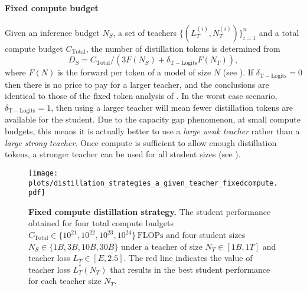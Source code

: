 \paragraph{Fixed compute budget}
Given an inference budget $N_S$, a set of teachers $\{(L_T^{(i)},N_T^{(i)})\}_{i=1}^n$ and a total compute budget $C_{\mathrm{Total}}$,
the number of distillation tokens is determined from 
\begin{equation}
    D_S=C_{\mathrm{Total}}/(3F(N_S)+\delta_{\mathrm{T-Logits}}F(N_T)),
\end{equation}
where $F(N)$ is the forward \flops per token of a model of size $N$ (see ).
If $\delta_{\mathrm{T-Logits}}=0$ then there is no price to pay for a larger teacher, and the conclusions are identical to those of the fixed token analysis of .
In the worst case scenario, $\delta_{\mathrm{T-Logits}}=1$, then using a larger teacher
will mean fewer distillation tokens are available for the student.
Due to the capacity gap phenomenon, at small compute budgets,
this means it is actually better to use a \emph{large weak teacher} rather than a \emph{large strong teacher}.
Once compute is sufficient to allow enough distillation tokens, a stronger teacher can be used for all student sizes (see ).

\begin{figure}[h]
	\centering
	\texttt{[image: plots/distillation\_strategies\_a\_given\_teacher\_fixedcompute.pdf]}
	\caption{\textbf{Fixed compute distillation strategy.} The student performance obtained for four total compute budgets $C_{\mathrm{Total}}\in\{10^{21},10^{22},10^{23},10^{24}\}\,\mathrm{FLOPs}$ and four student sizes $N_S\in\{1B, 3B, 10B, 30B\}$ under a teacher of size $N_T\in[1B,1T]$ and teacher loss $L_T\in[E,2.5]$. The red line indicates the value of teacher loss $L_T^*(N_T)$ that results in the best student performance for each teacher size $N_T$.
	}
	\label{fig:distillation-strategies-fixed-compute}
\end{figure}

\FloatBarrier
\clearpage

